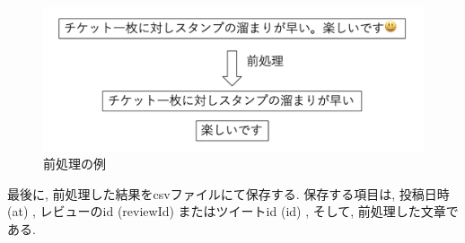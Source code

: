 \begin{figure}[H]
 \centering
 \includegraphics[scale=0.5]
      {contents/images/preprocessing.png}
 \caption{前処理の例\label{fig:preprocessing}}
\end{figure}

最後に, 前処理した結果をcsvファイルにて保存する. 保存する項目は, 投稿日時 (at) , レビューのid (reviewId) またはツイートid (id) , そして, 前処理した文章である. 


